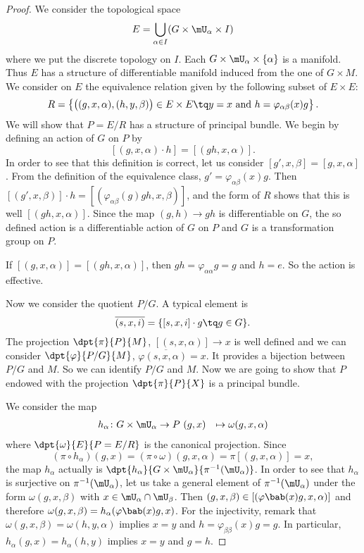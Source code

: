 				\begin{proof}
				We consider the topological space
				\begin{equation}
E=\bigcup_{\alpha\in I}(G\times\mU_{\alpha}\times I)
	\end{equation}
	where we put the discrete topology on $I$. Each $G\times\mU_{\alpha}\times\{\alpha\}$ is a manifold. Thus $E$ has a structure of differentiable manifold induced from the one of $G\times M$. We consider on $E$ the equivalence relation given by the following subset of $E\times E$:
	\[
		R=\left\{\big(  (g,x,\alpha),(h,y,\beta)\big)\in E\times E\tq y=x\text{ and }  h=\varphi_{\alpha\beta}(x)g \right\}.
		\]
		We will show that $P=E/R$ has a structure of principal bundle. We begin by defining an action of $G$ on $P$ by
		\[
			[ (g,x,\alpha)\cdot h ]=[ (gh,x,\alpha) ].
			\]
			In order to see that this definition is correct, let us consider $[g',x,\beta]=[g,x,\alpha]$. From the definition of the equivalence class, $g'=\varphi_{\alpha\beta}(x)g$. Then $[(g',x,\beta)]\cdot h=[(\varphi_{\alpha\beta}(g)gh,x,\beta)]$, and the form of $R$ shows that this is well $[(gh,x,\alpha)]$. Since the map $(g,h)\to gh$ is differentiable on $G$, the so defined action is a differentiable action of $G$ on $P$ and $G$ is a transformation group on $P$.

			If $[(g,x,\alpha)]=[(gh,x,\alpha)]$, then $gh=\varphi_{\alpha\alpha}g=g$ and $h=e$. So the action is effective.

			Now we consider the quotient $P/G$. A typical element is
			\[
				\overline{ (s,x,i) }=\{ [s,x,i]\cdot g\tq g\in G \}.
				\]
				The projection $\dpt{\pi}{P}{M}$, $[(s,x,\alpha)]\to x$ is well defined and we can consider $\dpt{\varphi}{P/G}{M}$, $\varphi\overline{(s,x,\alpha)}=x$. It provides a bijection between $P/G$ and $M$. So we can identify $P/G$ and $M$. Now we are going to show that $P$ endowed with the projection $\dpt{\pi}{P}{X}$ is a principal bundle.

				We consider the map
				\begin{equation}
				\begin{aligned}
				h_{\alpha} \colon G\times\mU_{\alpha} & \to P\
					(g,x)                                 & \mapsto \omega(g,x,\alpha)
					\end{aligned}
					\end{equation}
					where $\dpt{\omega}{E}{P=E/R}$ is the canonical projection. Since
					\[
						(\pi\circ h_{\alpha})(g,x)=(\pi\circ\omega)(g,x,\alpha)=\pi[(g,x,\alpha)]=x,
						\]
						the map $h_{\alpha}$ actually is $\dpt{h_{\alpha}}{G\times\mU_{\alpha}}{\pi^{-1}(\mU_{\alpha})}$. In order to see that $h_{\alpha}$ is surjective on $\pi^{-1}(\mU_{\alpha})$, let us take a general element of $\pi^{-1}(\mU_{\alpha})$ under the form $\omega(g,x,\beta)$ with $x\in\mU_{\alpha}\cap\mU_{\beta}$. Then $(g,x,\beta)\in[ (\varphi\bab(x)g,x,\alpha) ]$ and therefore $\omega(g,x,\beta)=h_{\alpha}(\varphi\bab(x)g,x)$. For the injectivity, remark that $\omega(g,x,\beta)=\omega(h,y,\alpha)$ implies $x=y$ and $h=\varphi_{\beta\beta}(x)g=g$. In particular, $h_{\alpha}(g,x)=h_{\alpha}(h,y)$ implies $x=y$ and $g=h$.


\end{proof}
